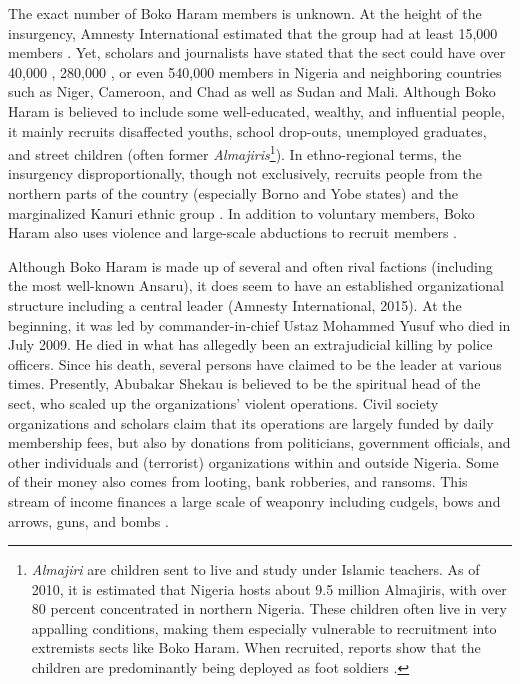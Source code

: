 The exact number of Boko Haram members is unknown. At the height of the insurgency, Amnesty International estimated that the group had at least 15,000 members \citep{AmnestyInternational2015}. Yet, scholars and journalists have stated that the sect could have over 40,000 \citep{Aghedo2012}, 280,000 \citep{Onuoha2010}, or even 540,000 \citep{Aliyu2015} members in Nigeria and neighboring countries such as Niger, Cameroon, and Chad as well as Sudan and Mali. Although Boko Haram is believed to include some well-educated, wealthy, and influential people, it mainly recruits disaffected youths, school drop-outs, unemployed graduates, and street children (often former \textit{Almajiris}\footnote{\textit{Almajiri} are children sent to live and study under Islamic teachers. As of 2010, it is estimated that Nigeria hosts about 9.5 million Almajiris, with over 80 percent concentrated in northern Nigeria. These children often live in very appalling conditions, making them especially vulnerable to recruitment into extremists sects like Boko Haram. When recruited, reports show that the children are predominantly being deployed as foot soldiers \citep{Onuoha2014}.}). In ethno-regional terms, the insurgency disproportionally, though not exclusively, recruits people from the northern parts of the country (especially Borno and Yobe states) and the marginalized Kanuri ethnic group \citep{Higazi2015}. In addition to voluntary members, Boko Haram also uses violence and large-scale abductions to recruit members \citep{David2015e}.
 
Although Boko Haram is made up of several and often rival factions (including the most well-known Ansaru), it does seem to have an established organizational structure including a central leader (Amnesty International, 2015). At the beginning, it was led by commander-in-chief Ustaz Mohammed Yusuf who died in July 2009. He died in what has allegedly been an extrajudicial killing by police officers. Since his death, several persons have claimed to be the leader at various times. Presently, Abubakar Shekau is believed to be the spiritual head of the sect, who scaled up the organizations’ violent operations. Civil society organizations and scholars claim that its operations are largely funded by daily membership fees, but also by donations from politicians, government officials, and other individuals and (terrorist) organizations within and outside Nigeria. Some of their money also comes from looting, bank robberies, and ransoms. This stream of income finances a large scale of weaponry including cudgels, bows and arrows, guns, and bombs \citep{Aghedo2012, Onuoha2012}.


